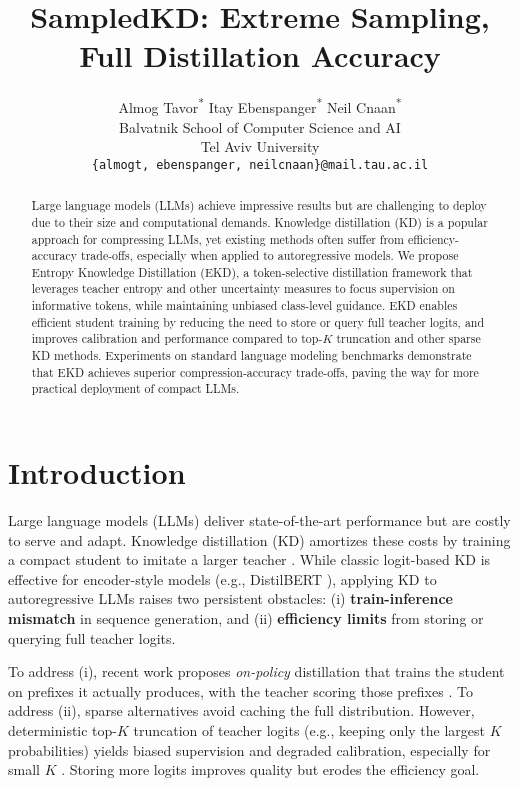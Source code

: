 \documentclass[11pt]{article}
\title{SampledKD: Extreme Sampling, Full Distillation Accuracy}
\author{
  Almog Tavor\textsuperscript{*} \qquad Itay Ebenspanger\textsuperscript{*} \qquad Neil Cnaan\textsuperscript{*} \\
  Balvatnik School of Computer Science and AI \\
  Tel Aviv University \\
  \texttt{\{almogt, ebenspanger, neilcnaan\}@mail.tau.ac.il} \\
}
\begin{document}
\maketitle
\let\thefootnote\relax
\footnotemark
{}
\begin{abstract}
	Large language models (LLMs) achieve impressive results but are challenging to deploy due to their size and computational demands. Knowledge distillation (KD) is a popular approach for compressing LLMs, yet existing methods often suffer from efficiency-accuracy trade-offs, especially when applied to autoregressive models. We propose Entropy Knowledge Distillation (EKD), a token-selective distillation framework that leverages teacher entropy and other uncertainty measures to focus supervision on informative tokens, while maintaining unbiased class-level guidance. EKD enables efficient student training by reducing the need to store or query full teacher logits, and improves calibration and performance compared to top-$K$ truncation and other sparse KD methods. Experiments on standard language modeling benchmarks demonstrate that EKD achieves superior compression-accuracy trade-offs, paving the way for more practical deployment of compact LLMs.
\end{abstract}

\section{Introduction}

Large language models (LLMs) deliver state-of-the-art performance but are costly to serve and adapt. Knowledge distillation (KD) amortizes these costs by training a compact student to imitate a larger teacher \citep{hinton2015distillation}. While classic logit-based KD is effective for encoder-style models (e.g., DistilBERT \citep{sanh2019distilbert}), applying KD to autoregressive LLMs raises two persistent obstacles: (i) \textbf{train-inference mismatch} in sequence generation, and (ii) \textbf{efficiency limits} from storing or querying full teacher logits.

To address (i), recent work proposes \emph{on-policy} distillation that trains the student on prefixes it actually produces, with the teacher scoring those prefixes \citep{agarwal2024gkd}. To address (ii), sparse alternatives avoid caching the full distribution. However, deterministic top-$K$ truncation of teacher logits (e.g., keeping only the largest $K$ probabilities) yields biased supervision and degraded calibration, especially for small $K$ \citep{anshumann2025sparse,shum2024first}. Storing more logits improves quality but erodes the efficiency goal.
\end{document}
